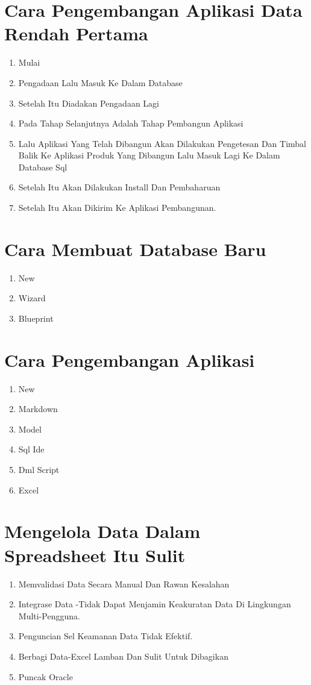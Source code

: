 \documentclass{article}
\begin{document}
 \section{Cara Pengembangan Aplikasi Data Rendah Pertama}
 \begin{enumerate}
     \item Mulai
    \item Pengadaan Lalu Masuk Ke Dalam Database
    \item Setelah Itu Diadakan Pengadaan Lagi
    \item Pada Tahap Selanjutnya Adalah Tahap Pembangun Aplikasi
    \item Lalu Aplikasi Yang Telah Dibangun Akan Dilakukan Pengetesan Dan Timbal Balik Ke Aplikasi Produk Yang Dibangun Lalu Masuk Lagi Ke Dalam Database Sql
    \item Setelah Itu Akan Dilakukan Install Dan Pembaharuan
    \item Setelah Itu Akan Dikirim Ke Aplikasi Pembangunan.
 \end{enumerate}
 
 \section{Cara Membuat Database Baru}
 \begin{enumerate}
     \item New
\item Wizard
\item Blueprint

 \end{enumerate}
 
 \section{Cara Pengembangan Aplikasi}
 \begin{enumerate}
     \item New
\item Markdown
\item Model
\item Sql Ide
\item Dml Script
\item Excel
 \end{enumerate}
    
\section{Mengelola Data Dalam Spreadsheet Itu Sulit}
\begin{enumerate}
    \item Memvalidasi Data Secara Manual Dan Rawan Kesalahan
\item Integrase Data -Tidak Dapat Menjamin Keakuratan Data Di Lingkungan Multi-Pengguna.
\item Penguncian Sel Keamanan Data Tidak Efektif.
\item Berbagi Data-Excel Lamban Dan Sulit Untuk Dibagikan
\item Puncak Oracle
\end{enumerate}
\end{document}
